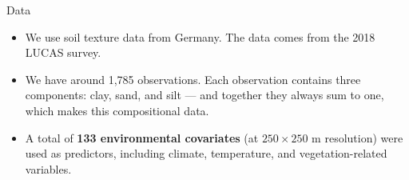 \begin{frame}{Data}

\begin{itemize}[label=\textbullet]
  \item We use soil texture data from Germany. The data comes from the 2018 LUCAS survey.

  \vspace{0.5em}

  \item We have around 1,785 observations. Each observation contains three components: clay, sand, and silt --- and together they always sum to one, which makes this compositional data.

  \vspace{0.5em}

  \item A total of \textbf{133 environmental covariates} (at $250 \times 250$ m resolution) were used as predictors, including climate, temperature, and vegetation-related variables.
\end{itemize}

\end{frame}


